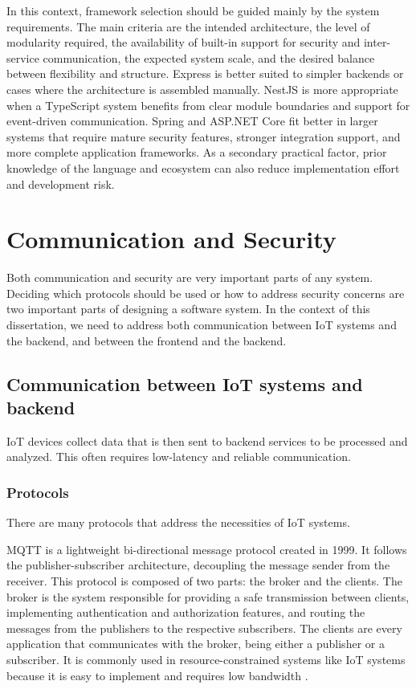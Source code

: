 In this context, framework selection should be guided mainly by the system
requirements. The main criteria are the intended architecture, the level of
modularity required, the availability of built-in support for security and
inter-service communication, the expected system scale, and the desired balance
between flexibility and structure. Express is better suited to simpler
backends or cases where the architecture is assembled manually. NestJS is more
appropriate when a TypeScript system benefits from clear module boundaries and
support for event-driven communication. Spring and ASP.NET Core fit better in
larger systems that require mature security features, stronger integration
support, and more complete application frameworks. As a secondary practical
factor, prior knowledge of the language and ecosystem can also reduce
implementation effort and development risk.

\section{Communication and Security}
Both communication and security are very important parts of any system.
Deciding which protocols should be used or how to address security concerns are two
important parts of designing a software system. In the context of this
dissertation, we need to address both communication between \gls{IoT} systems and
the backend, and between the frontend and the backend.


\subsection{Communication between IoT systems and backend}
\gls{IoT} devices collect data that is then sent to backend services to be processed
and analyzed. This often requires low-latency and reliable communication.
\subsubsection{Protocols}
There are many protocols that address the necessities of \gls{IoT} systems.

MQTT is a lightweight bi-directional message protocol created in 1999.
It follows the publisher-subscriber architecture, decoupling the message
sender from the receiver. This protocol is composed of two parts: the
broker and the clients. The broker is the system responsible for providing
a safe transmission between clients, implementing authentication and
authorization features, and routing the messages from the publishers to
the respective subscribers. The clients are every application that
communicates with the broker, being either a publisher or a subscriber.
It is commonly used in resource-constrained systems like IoT systems because
it is easy to implement and requires low bandwidth \cite{Jayapal2019, CommunicationProtocols}.

